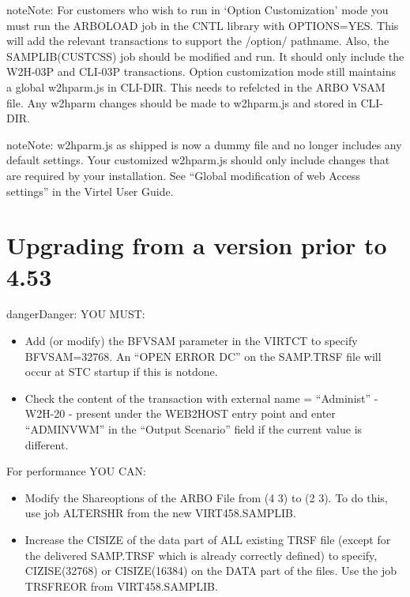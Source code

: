 \documentclass[letterpaper,10pt,english]{sphinxmanual}
\begin{document}
\begin{sphinxadmonition}{note}{Note:}
For customers who wish to run in ‘Option Customization’ mode you must run the ARBOLOAD job in the CNTL library with OPTIONS=YES. This will add the relevant transactions to support the /option/ pathname. Also, the SAMPLIB(CUSTCSS) job should be modified and run. It should only include the W2H-03P and CLI-03P transactions. Option customization mode still maintains a global w2hparm.js in CLI-DIR. This needs to refelcted in the ARBO VSAM file. Any w2hparm changes should be made to w2hparm.js and stored in CLI-DIR.
\end{sphinxadmonition}

\begin{sphinxadmonition}{note}{Note:}
w2hparm.js as shipped is now a dummy file and no longer includes any default settings. Your customized w2hparm.js should only include changes that are required by your installation. See “Global modification of web Access settings” in the Virtel User Guide.
\end{sphinxadmonition}


\section{Upgrading from a version prior to 4.53}
\label{\detokenize{Migration_Guide:upgrading-from-a-version-prior-to-4-53}}\label{\detokenize{Migration_Guide:index-3}}
\begin{sphinxadmonition}{danger}{Danger:}
YOU MUST:
\end{sphinxadmonition}
\begin{itemize}
\item {} 
Add (or modify) the BFVSAM parameter in the VIRTCT to specify BFVSAM=32768. An “OPEN ERROR DC” on the SAMP.TRSF file will occur at STC startup if this is notdone.

\item {} 
Check the content of the transaction with external name = “Administ” - W2H-20 - present under the WEB2HOST entry point and enter “ADMINVWM” in the “Output Scenario” field if the current value is different.

\end{itemize}

For performance YOU CAN:
\begin{itemize}
\item {} 
Modify the Shareoptions of the ARBO File from (4 3) to (2 3). To do this, use job ALTERSHR from the new VIRT458.SAMPLIB.

\item {} 
Increase the CISIZE of the data part of ALL existing TRSF file (except for the delivered SAMP.TRSF which is already correctly defined) to specify, CIZISE(32768) or CISIZE(16384) on the DATA part of the files. Use the job TRSFREOR from VIRT458.SAMPLIB.

\end{itemize}
\end{document}
